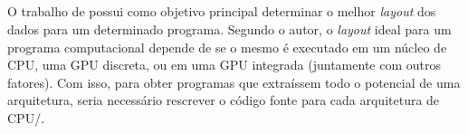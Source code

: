 




\subsection{}

O trabalho de  possui como objetivo principal determinar o melhor \textit{layout} dos dados para um determinado programa. Segundo o autor, o \textit{layout} ideal para um programa computacional depende de se o mesmo é executado em um núcleo de CPU, uma GPU discreta, ou em uma GPU integrada (juntamente com outros fatores). Com isso, para obter programas que extraíssem todo o potencial de uma arquitetura, seria necessário rescrever o código fonte para cada arquitetura de CPU\@/\@GPU.

